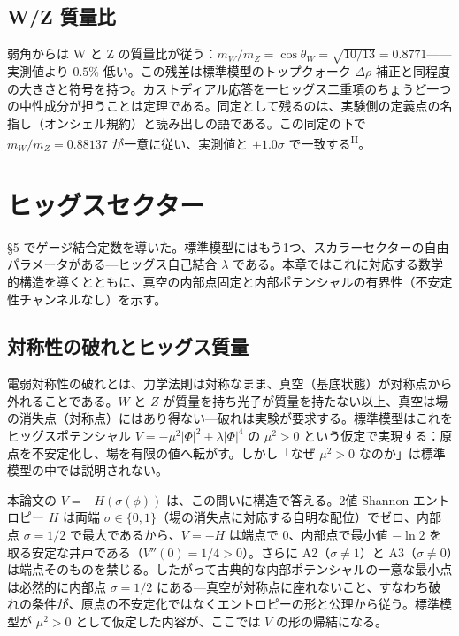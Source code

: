 \documentclass[fontsize=11pt,paper=a4,lualatex]{jlreq}
\newcommand{\PII}{\textsuperscript{\textup{II}}}
\begin{document}
\subsection{W/Z 質量比}

弱角からは W と Z の質量比が従う：$m_W/m_Z = \cos\theta_W = \sqrt{10/13} = 0.8771$——実測値より $0.5\%$ 低い。この残差は標準模型のトップクォーク $\Delta\rho$ 補正と同程度の大きさと符号を持つ。カストディアル応答を一ヒッグス二重項のちょうど一つの中性成分が担うことは定理である。同定として残るのは、実験側の定義点の名指し（オンシェル規約）と読み出しの語である。この同定の下で $m_W/m_Z = 0.88137$ が一意に従い、実測値と $+1.0\sigma$ で一致する\PII{}。


\section{ヒッグスセクター}\label{sec:higgs}

§5 でゲージ結合定数を導いた。標準模型にはもう1つ、スカラーセクターの自由パラメータがある---ヒッグス自己結合 $\lambda$ である。本章ではこれに対応する数学的構造を導くとともに、真空の内部点固定と内部ポテンシャルの有界性（不安定性チャンネルなし）を示す。

\subsection{対称性の破れとヒッグス質量}

電弱対称性の破れとは、力学法則は対称なまま、真空（基底状態）が対称点から外れることである。$W$ と $Z$ が質量を持ち光子が質量を持たない以上、真空は場の消失点（対称点）にはあり得ない---破れは実験が要求する。標準模型はこれをヒッグスポテンシャル $V = -\mu^2|\Phi|^2 + \lambda|\Phi|^4$ の $\mu^2 > 0$ という仮定で実現する：原点を不安定化し、場を有限の値へ転がす。しかし「なぜ $\mu^2 > 0$ なのか」は標準模型の中では説明されない。

本論文の $V = -H(\sigma(\phi))$ は、この問いに構造で答える。2値 Shannon エントロピー $H$ は両端 $\sigma \in \{0,1\}$（場の消失点に対応する自明な配位）でゼロ、内部点 $\sigma = 1/2$ で最大であるから、$V = -H$ は端点で 0、内部点で最小値 $-\ln 2$ を取る安定な井戸である（$V''(0) = 1/4 > 0$）。さらに A2（$\sigma \neq 1$）と A3（$\sigma \neq 0$）は端点そのものを禁じる。したがって古典的な内部ポテンシャルの一意な最小点は必然的に内部点 $\sigma = 1/2$ にある---真空が対称点に座れないこと、すなわち破れの条件が、原点の不安定化ではなくエントロピーの形と公理から従う。標準模型が $\mu^2 > 0$ として仮定した内容が、ここでは $V$ の形の帰結になる。
\end{document}
